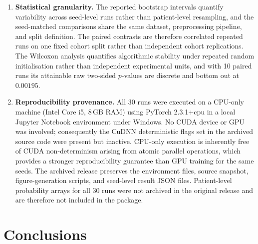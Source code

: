\documentclass[mathematics,article,submit,pdftex]{Definitions/mdpi}
\begin{document}
\begin{enumerate}[leftmargin=1.4em]
    \item \textbf{Statistical granularity.} The reported bootstrap intervals quantify variability across seed-level runs rather than patient-level resampling, and the seed-matched comparisons share the same dataset, preprocessing pipeline, and split definition. The paired contrasts are therefore correlated repeated runs on one fixed cohort split rather than independent cohort replications. The Wilcoxon analysis quantifies algorithmic stability under repeated random initialisation rather than independent experimental units, and with 10 paired runs its attainable raw two-sided $p$-values are discrete and bottom out at $0.00195$.
    \item \textbf{Reproducibility provenance.} All 30 runs were executed on a CPU-only machine (Intel Core i5, 8\,GB RAM) using PyTorch 2.3.1+cpu in a local Jupyter Notebook environment under Windows. No CUDA device or GPU was involved; consequently the CuDNN deterministic flags set in the archived source code were present but inactive. CPU-only execution is inherently free of CUDA non-determinism arising from atomic parallel operations, which provides a stronger reproducibility guarantee than GPU training for the same seeds. The archived release preserves the environment files, source snapshot, figure-generation scripts, and seed-level result JSON files. Patient-level probability arrays for all 30 runs were not archived in the original release and are therefore not included in the package.
\end{enumerate}

\section{Conclusions}\label{sec:conclusion}
\end{document}

